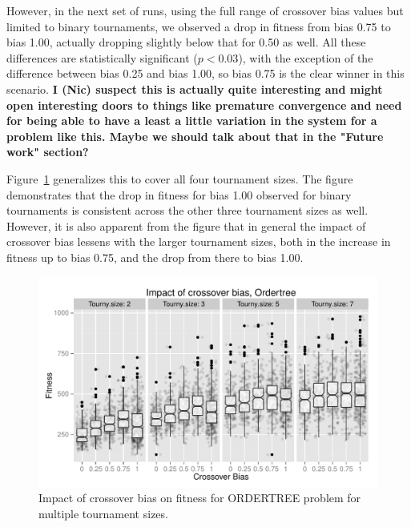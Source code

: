 \documentclass{sig-alternate}
\begin{document}
However, in the next set of runs, using the full range of crossover bias values but limited to binary tournaments, we
observed a drop in fitness from bias 0.75 to bias 1.00, actually dropping slightly below that for 0.50 as well. All
these differences are statistically significant ($p < 0.03$), with the exception of the difference between bias 0.25
and bias 1.00, so bias 0.75 is the clear winner in this scenario. \textbf{I (Nic) suspect this is actually quite
interesting and might open interesting doors to things like premature convergence and need for being able to have a
least a little variation in the system for a problem like this. Maybe we should talk about that in the "Future work"
section?}

Figure~\ref{fig:Ordertree_results_all_tournaments_Jan15} generalizes this to cover all four tournament sizes. The
figure demonstrates that the drop in fitness for bias 1.00 observed for binary tournaments is consistent across the
other three tournament sizes as well. However, it is also apparent from the figure that in general the impact of
crossover bias lessens with the larger tournament sizes, both in the increase in fitness up to bias 0.75, and the drop
from there to bias 1.00.

\begin{figure}
\centering
\includegraphics[width=0.45 \textwidth]{Plots/Ordertree_results_all_tournaments_Jan15.pdf}
\caption{Impact of crossover bias on fitness for ORDERTREE problem for multiple tournament sizes.}
\label{fig:Ordertree_results_all_tournaments_Jan15}
\end{figure}

%
%
%
%
\end{document}
